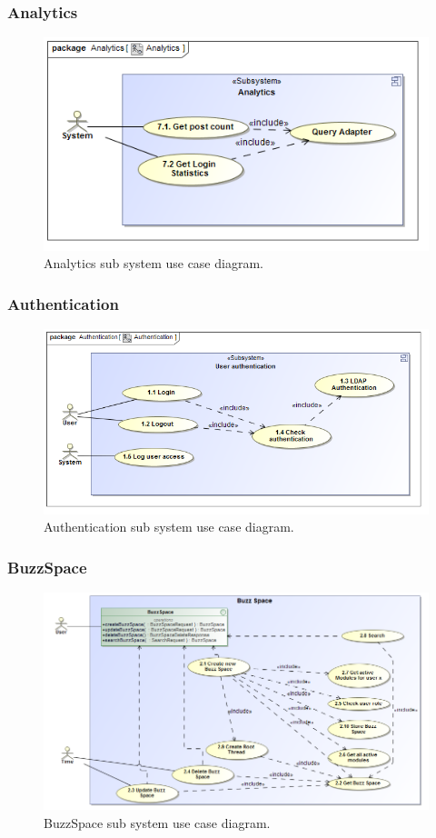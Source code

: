 \documentclass [a4paper,12pt] {article}
\begin{document}
		\subsubsection{Analytics}
			\begin{figure}[H]
				\centering
				\includegraphics[width=1.0\textwidth]{AnalyticsUC.png}
				\caption{Analytics sub system use case diagram.}
			\end{figure}
		\subsubsection{Authentication}
			\begin{figure}[H]
				\centering
				\includegraphics[width=1.0\textwidth]{AuthenticationUC.png}
				\caption{Authentication sub system use case diagram.}
			\end{figure}
		\subsubsection{BuzzSpace}
			\begin{figure}[H]
				\centering
				\includegraphics[width=1.0\textwidth]{BuzzSpaceUC.png}
				\caption{BuzzSpace sub system use case diagram.}
			\end{figure}
\end{document}
